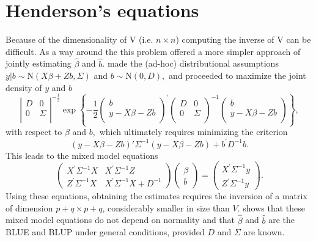 \documentclass[12pt, a4paper]{report}
\theoremstyle{plain}
\theoremstyle{definition}
\theoremstyle{remark}
\begin{document}
\section{Henderson's equations}
Because of the dimensionality of V (i.e. $n \times n$) computing the inverse of V can be difficult. As a way around the this problem \citet{Henderson53, Henderson59,Henderson63,Henderson73,Henderson84a} offered a more simpler approach of jointly estimating $\hat{\beta}$ and $\hat{b}$.
\cite{Henderson:1950} made the (ad-hoc) distributional assumptions $y|b \sim \mathrm{N} (X \beta + Zb, \Sigma)$ and $b \sim \mathrm{N}(0,D),$ and proceeded to maximize the joint density of $y$ and $b$
\begin{equation}
\left|
\begin{array}{cc}
D & 0 \\
0 & \Sigma \\
\end{array}
\right|^{-\frac{1}{2}}
\exp
\left\{ -\frac{1}{2}
\left(
\begin{array}{c}
b \\
y - X \beta -Zb \\
\end{array}
\right)^\prime
\left( \begin{array}{cc}
D & 0 \\
0 & \Sigma \\
\end{array}\right)^{-1}
\left(
\begin{array}{c}
b \\
y - X \beta -Zb \\
\end{array}
\right)
\right\},
\label{u&beta:JointDensity}
\end{equation}
with respect to $\beta$ and $b,$ which ultimately requires minimizing the criterion
\begin{equation}
(y - X \beta -Zb)'\Sigma^{-1}(y - X \beta -Zb) + b^\prime D^{-1}b.
\label{Henderson:Criterion}
\end{equation}
This leads to the mixed model equations
\begin{equation}
\left(\begin{array}{cc}
X^\prime\Sigma^{-1}X & X^\prime\Sigma^{-1}Z
\\
Z^\prime\Sigma^{-1}X & X^\prime\Sigma^{-1}X + D^{-1}
\end{array}\right)
\left(\begin{array}{c}
\beta \\
b
\end{array}\right)
=
\left(\begin{array}{c}
X^\prime\Sigma^{-1}y \\
Z^\prime\Sigma^{-1}y
\end{array}\right).
\label{Henderson:Equations}
\end{equation}
Using these equations, obtaining the estimates requires the inversion of a matrix
of dimension $p+q \times p+q$, considerably smaller in size than $V$. \citet{Henderson1963} shows that these mixed model equations do not depend on normality and that $\hat{\beta}$ and $\hat{b}$ are the BLUE and BLUP under general conditions, provided $D$ and $\Sigma$ are known.
\end{document}
